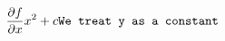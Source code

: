 \documentclass[preview]{standalone}
\begin{document}
\begin{align*}
\frac{\partial f}{\partial x} x^2 + c \verb|We treat y as a constant|
\end{align*}
\end{document}
